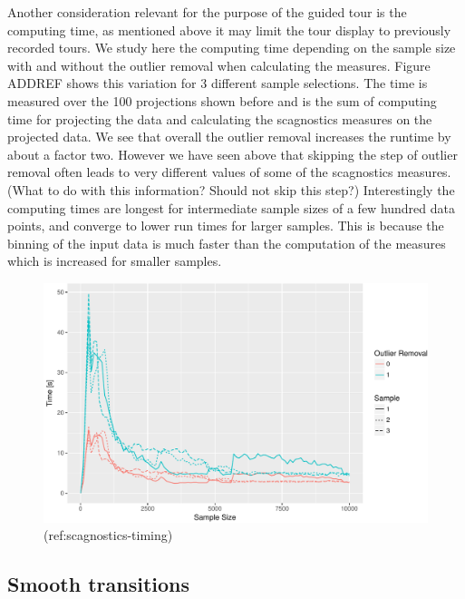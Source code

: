 \documentclass[article]{jss}
\begin{document}
Another consideration relevant for the purpose of the guided tour is the
computing time, as mentioned above it may limit the tour display to
previously recorded tours. We study here the computing time depending on
the sample size with and without the outlier removal when calculating
the measures. Figure ADDREF shows this variation for 3 different sample
selections. The time is measured over the 100 projections shown before
and is the sum of computing time for projecting the data and calculating
the scagnostics measures on the projected data. We see that overall the
outlier removal increases the runtime by about a factor two. However we
have seen above that skipping the step of outlier removal often leads to
very different values of some of the scagnostics measures. (What to do
with this information? Should not skip this step?) Interestingly the
computing times are longest for intermediate sample sizes of a few
hundred data points, and converge to lower run times for larger samples.
This is because the binning of the input data is much faster than the
computation of the measures which is increased for smaller samples.

\begin{CodeChunk}
\begin{figure}

{\centering \includegraphics[width=\textwidth]{figure/scagnositcs-timing-1} 

}

\caption[(ref:scagnostics-timing)]{(ref:scagnostics-timing)}\label{fig:scagnositcs-timing}
\end{figure}
\end{CodeChunk}

\subsection{Smooth transitions}\label{smooth-transitions}
\end{document}
